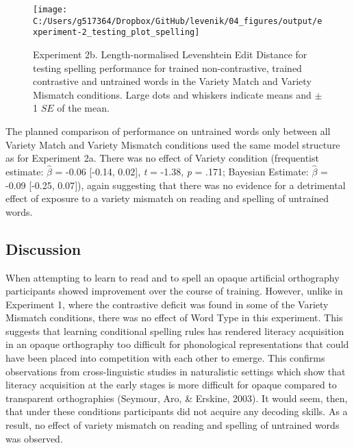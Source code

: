 \documentclass[doc,floatsintext]{apa6}
\begin{document}
\begin{figure}[H]

{\centering \texttt{[image: C:/Users/g517364/Dropbox/GitHub/levenik/04\_figures/output/experiment-2\_testing\_plot\_spelling]} 

}

\caption{Experiment 2b. Length-normalised Levenshtein Edit Distance for testing spelling performance for trained non-contrastive, trained contrastive and untrained words in the Variety Match and Variety Mismatch conditions. Large dots and whiskers indicate means and $\pm$ 1 $SE$ of the mean.}\label{fig:ex2-test-spelling-plots}
\end{figure}

The planned comparison of performance on untrained words only between
all Variety Match and Variety Mismatch conditions used the same model
structure as for Experiment 2a. There was no effect of Variety condition
(frequentist estimate: \(\hat{\beta}\) = -0.06 {[}-0.14, 0.02{]},
\emph{t} = -1.38, \emph{p} = .171; Bayesian Estimate: \(\hat{\beta}\) =
-0.09 {[}-0.25, 0.07{]}), again suggesting that there was no evidence
for a detrimental effect of exposure to a variety mismatch on reading
and spelling of untrained words.

\subsection{Discussion}\label{discussion-2}

When attempting to learn to read and to spell an opaque artificial
orthography participants showed improvement over the course of training.
However, unlike in Experiment 1, where the contrastive deficit was found
in some of the Variety Mismatch conditions, there was no effect of Word
Type in this experiment. This suggests that learning conditional
spelling rules has rendered literacy acquisition in an opaque
orthography too difficult for phonological representations that could
have been placed into competition with each other to emerge. This
confirms observations from cross-linguistic studies in naturalistic
settings which show that literacy acquisition at the early stages is
more difficult for opaque compared to transparent orthographies
(Seymour, Aro, \& Erskine, 2003). It would seem, then, that under these
conditions participants did not acquire any decoding skills. As a
result, no effect of variety mismatch on reading and spelling of
untrained words was observed.
\end{document}
